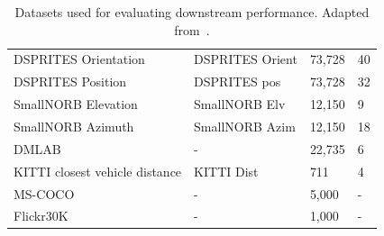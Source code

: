 \begin{appendix}
\begin{table}[!h]
\begin{tabular}{@{}llll@{}}
DSPRITES Orientation & DSPRITES Orient & 73,728 &40\\
DSPRITES Position & DSPRITES pos & 73,728 &32\\
SmallNORB Elevation & SmallNORB Elv & 12,150 &9\\
SmallNORB Azimuth & SmallNORB Azim & 12,150 &18\\
DMLAB & - & 22,735 &6\\
KITTI closest vehicle distance & KITTI Dist & 711 &4\\ \midrule
MS-COCO & - & 5,000 & -\\
Flickr30K & - & 1,000 & -\\
\bottomrule
\end{tabular}
\caption{Datasets used for evaluating downstream performance. Adapted from~\citep{Schuhmann2022}.}
\label{tab:datasets_list}
\end{table}





\end{appendix}

